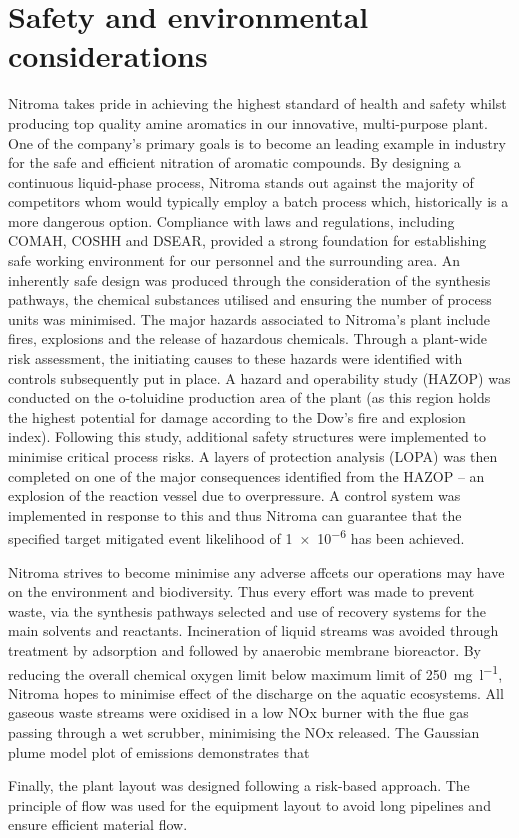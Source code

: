 \section*{Safety and environmental considerations}

Nitroma takes pride in achieving the highest standard of health and safety whilst producing top quality amine aromatics in our innovative, multi-purpose plant. One of the company's primary goals is to become an leading example in industry for the safe and efficient nitration of aromatic compounds. By designing a continuous liquid-phase process, Nitroma stands out against the majority of competitors whom would typically employ a batch process which, historically is a more dangerous option. Compliance with laws and regulations, including COMAH, COSHH and DSEAR, provided a strong foundation for establishing safe working environment for our personnel and the surrounding area. An inherently safe design was produced through the consideration of the synthesis pathways, the chemical substances utilised and ensuring the number of process units was minimised. The major hazards associated to Nitroma's plant include fires, explosions and the release of hazardous chemicals. Through a plant-wide risk assessment, the initiating causes to these hazards were identified with controls subsequently put in place. A hazard and operability study (HAZOP) was conducted on the o-toluidine production area of the plant (as this region holds the highest potential for damage according to the Dow's fire and explosion index). Following this study, additional safety structures were implemented to minimise critical process risks. A layers of protection analysis (LOPA) was then completed on one of the major consequences identified from the HAZOP – an explosion of the reaction vessel due to overpressure. A control system was implemented in response to this and thus Nitroma can guarantee that the specified target mitigated event likelihood of \num{1e-6} has been achieved.

Nitroma strives to become minimise any adverse affcets our operations may have on the environment and biodiversity. Thus every effort was made to prevent waste, via the synthesis pathways selected and use of recovery systems for the main solvents and reactants. Incineration of liquid streams was avoided through treatment by adsorption and followed by anaerobic membrane bioreactor. By reducing the overall chemical oxygen limit below maximum limit of \SI{250}{\mg\per\litre}, Nitroma hopes to minimise effect of the discharge on the  aquatic ecosystems. All gaseous waste streams were oxidised in a low NOx burner with the flue gas passing through a wet scrubber, minimising the NOx released. The Gaussian plume model plot of emissions demonstrates that 

Finally, the plant layout was designed following a risk-based approach. The principle of flow was used for the equipment layout to avoid long pipelines and ensure efficient material flow. 




